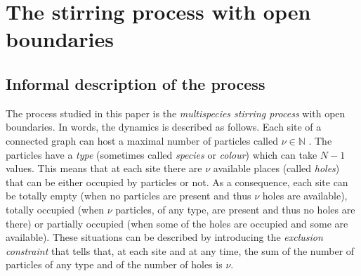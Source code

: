 \documentclass[10pt]{article}
\numberwithin{equation}{section}
\numberwithin{equation}{subsection}
\begin{document}
\section{The stirring process with open boundaries}
\label{sec1}
\subsection{Informal description of the process}
The process studied in this paper is the {\em multispecies stirring process}
with open boundaries. 
In words, the dynamics is described as follows. Each site
of a connected graph can host a maximal number of particles called $\nu\in \mathbb{N}$ .
The particles have a {\em type} (sometimes called {\em species} or {\em colour})
which can take $N-1$ values. {\color{blue}This means that at each site there are $\nu$ available places (called \textit{holes}) that can be either occupied by particles or not. As a consequence, each site can be totally empty (when no particles are present and thus $\nu$ holes are available), totally occupied (when $\nu$ particles, of any type, are present and thus no holes are there) or partially occupied (when some of the holes are occupied and some are available). These situations can be described by introducing the \textit{exclusion constraint} that tells that, at each site and at any time, the sum of the number of particles of any type and of the number of holes is $\nu$.}
\end{document}
